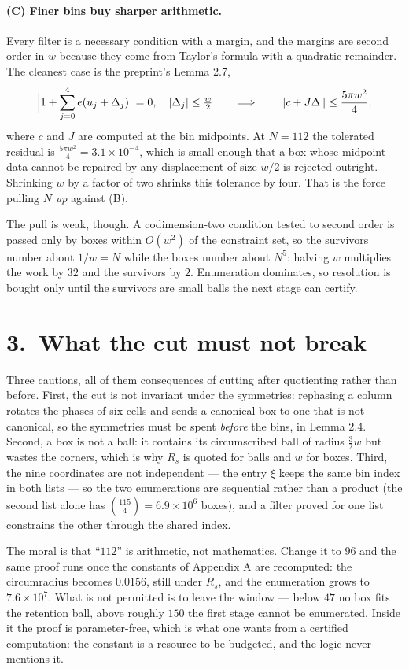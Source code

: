 \documentclass[11pt]{article}
\newcommand{\abs}[1]{\lvert #1\rvert}
\newcommand{\norm}[1]{\lVert #1\rVert}
\begin{document}
\paragraph{(C) Finer bins buy sharper arithmetic.} Every filter is a necessary condition with a margin, and
the margins are second order in $w$ because they come from Taylor's formula with a quadratic
remainder. The cleanest case is the preprint's Lemma 2.7,
\[
\Bigl|1+\sum_{j=0}^{4}e(u_j+\Delta_j)\Bigr|=0,\quad \abs{\Delta_j}\le \tfrac w2
\qquad\Longrightarrow\qquad
\norm{c+J\Delta}\le \frac{5\pi w^2}{4},
\]
where $c$ and $J$ are computed at the bin midpoints. At $N=112$ the tolerated residual is
$\frac{5\pi w^2}{4}=3.1\times10^{-4}$, which is small enough that a box whose midpoint data cannot be
repaired by any displacement of size $w/2$ is rejected outright. Shrinking $w$ by a factor of two
shrinks this tolerance by four. That is the force pulling $N$ \emph{up} against (B).

The pull is weak, though. A codimension-two condition tested to second order is passed only by boxes
within $O(w^2)$ of the constraint set, so the survivors number about $1/w=N$ while the boxes number
about $N^5$: halving $w$ multiplies the work by $32$ and the survivors by $2$. Enumeration dominates,
so resolution is bought only until the survivors are small balls the next stage can certify.

\section*{3.\ What the cut must not break}

Three cautions, all of them consequences of cutting after quotienting rather than before. First, the
cut is not invariant under the symmetries: rephasing a column rotates the phases of six cells and
sends a canonical box to one that is not canonical, so the symmetries must be spent \emph{before} the
bins, in Lemma 2.4. Second, a box is not a ball: it contains its circumscribed ball of radius
$\tfrac32w$ but wastes the corners, which is why $R_s$ is quoted for balls and $w$ for boxes. Third,
the nine coordinates are not independent --- the entry $\xi$ keeps the same bin index in both lists
--- so the two enumerations are sequential rather than a product (the second list alone has
$\binom{115}{4}=6.9\times10^{6}$ boxes), and a filter proved for one list constrains the other through
the shared index.

\medskip
\noindent
The moral is that ``$112$'' is arithmetic, not mathematics. Change it to $96$ and the same proof runs
once the constants of Appendix A are recomputed: the circumradius becomes $0.0156$, still under
$R_s$, and the enumeration grows to $7.6\times10^{7}$. What is not permitted is to leave the window
--- below $47$ no box fits the retention ball, above roughly $150$ the first stage cannot be
enumerated. Inside it the proof is parameter-free, which is what one wants from a certified
computation: the constant is a resource to be budgeted, and the logic never mentions it.
\end{document}
